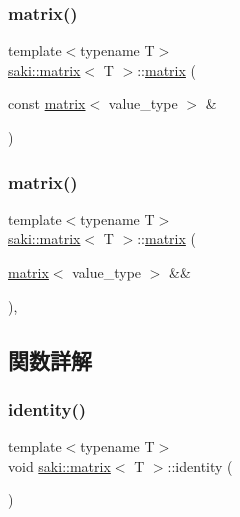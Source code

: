 \subsubsection{\texorpdfstring{matrix()}{matrix()}\hspace{0.1cm}{\footnotesize\ttfamily [5/6]}}
{\footnotesize\ttfamily template$<$typename T$>$ \\
\mbox{\hyperlink{classsaki_1_1matrix}{saki\+::matrix}}$<$ T $>$\+::\mbox{\hyperlink{classsaki_1_1matrix}{matrix}} (\begin{DoxyParamCaption}\item[{const \mbox{\hyperlink{classsaki_1_1matrix}{matrix}}$<$ value\+\_\+type $>$ \&}]{ }\end{DoxyParamCaption})\hspace{0.3cm}{\ttfamily [default]}}

\mbox{\label{classsaki_1_1matrix_a16b927b776bc7454ebbf984b7f93c23e}} 
\subsubsection{\texorpdfstring{matrix()}{matrix()}\hspace{0.1cm}{\footnotesize\ttfamily [6/6]}}
{\footnotesize\ttfamily template$<$typename T$>$ \\
\mbox{\hyperlink{classsaki_1_1matrix}{saki\+::matrix}}$<$ T $>$\+::\mbox{\hyperlink{classsaki_1_1matrix}{matrix}} (\begin{DoxyParamCaption}\item[{\mbox{\hyperlink{classsaki_1_1matrix}{matrix}}$<$ value\+\_\+type $>$ \&\&}]{ }\end{DoxyParamCaption})\hspace{0.3cm}{\ttfamily [default]}, {\ttfamily [noexcept]}}



\subsection{関数詳解}
\mbox{\label{classsaki_1_1matrix_a9f7f8909ee94f44e91faca871f57b936}} 
\subsubsection{\texorpdfstring{identity()}{identity()}}
{\footnotesize\ttfamily template$<$typename T$>$ \\
void \mbox{\hyperlink{classsaki_1_1matrix}{saki\+::matrix}}$<$ T $>$\+::identity (\begin{DoxyParamCaption}{ }\end{DoxyParamCaption})\hspace{0.3cm}{\ttfamily [inline]}}



